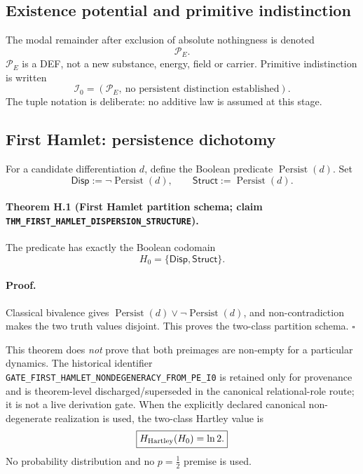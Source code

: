 \documentclass[11pt]{article}
\newcommand{\claimid}[1]{\nolinkurl{#1}}
\begin{document}
\subsection{Existence potential and primitive indistinction}

The modal remainder after exclusion of absolute nothingness is denoted
\[
\boxed{\mathcal P_E}.
\]
\(\mathcal P_E\) is a DEF, not a new substance, energy, field or carrier.
Primitive indistinction is written
\[
\boxed{
\mathcal I_0
=
(\mathcal P_E,\ \text{no persistent distinction established}).
}
\]
The tuple notation is deliberate: no additive law is assumed at this stage.

\subsection{First Hamlet: persistence dichotomy}

For a candidate differentiation \(d\), define the Boolean predicate
\(\operatorname{Persist}(d)\). Set
\[
\mathsf{Disp}:=\neg\operatorname{Persist}(d),
\qquad
\mathsf{Struct}:=\operatorname{Persist}(d).
\]

\paragraph{Theorem H.1 (First Hamlet partition schema; claim
\claimid{THM_FIRST_HAMLET_DISPERSION_STRUCTURE}).}
The predicate has exactly the Boolean codomain
\[
\boxed{H_0=\{\mathsf{Disp},\mathsf{Struct}\}.}
\]

\paragraph{Proof.}
Classical bivalence gives
\(\operatorname{Persist}(d)\lor\neg\operatorname{Persist}(d)\), and
non-contradiction makes the two truth values disjoint. This proves the
two-class partition schema. \(\square\)

This theorem does \emph{not} prove that both preimages are non-empty for a
particular dynamics. The historical identifier
\claimid{GATE_FIRST_HAMLET_NONDEGENERACY_FROM_PE_I0} is retained only for
provenance and is theorem-level discharged/superseded in the canonical
relational-role route; it is not a live derivation gate.
When the explicitly declared canonical non-degenerate realization is used,
the two-class Hartley value is \cite{Hartley1928}
\[
\boxed{H_{\rm Hartley}(H_0)=\ln2.}
\]
No probability distribution and no \(p=\tfrac12\) premise is used.
\end{document}

